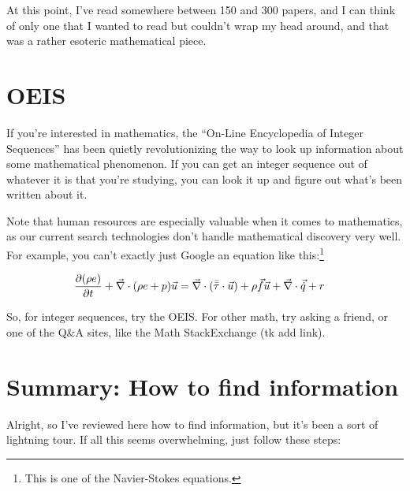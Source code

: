At this point, I've read somewhere between 150 and 300 papers, and I can think
of only one that I wanted to read but couldn't wrap my head around, and that was
a rather esoteric mathematical piece.

\section{OEIS}

If you're interested in mathematics, the ``On-Line Encyclopedia of Integer
Sequences'' has been quietly revolutionizing the way to look up information
about some mathematical phenomenon. If you can get an integer sequence out of whatever it is that you're studying,
you can look it up and figure out what's been written about it.

Note that human resources are especially valuable when it comes to mathematics,
as our current search technologies don't handle mathematical discovery very
well. For example, you can't exactly just Google an equation like this:\footnote{This is one of the Navier-Stokes equations.}

\begin{align}
      \pdv{(\rho e)}{t}+\vec{\nabla}\cdot(\rho e+p)\vec{u} &= \vec{\nabla}\cdot(\Bar{\Bar{\tau}}\cdot\vec{u})+\rho\vec{f}\vec{u}+\vec{\nabla}\cdot\vec{\dot{q}}+r
\end{align}

So, for integer sequences, try the OEIS. For other math, try asking a friend, or
one of the Q\&A sites, like the Math StackExchange (tk add link).

\section{Summary: How to find information}

Alright, so I've reviewed here how to find information, but it's been a sort of
lightning tour. If all this seems overwhelming, just follow these steps:

